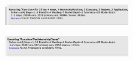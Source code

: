 \begin{figure}[h!]
    \centering\includegraphics[width=0.5\textwidth]{RASD/Images/Alloy/predclose.png}
    \label{fig:predclose}
\end{figure}
\begin{figure}[h!]
    \centering\includegraphics[width=0.5\textwidth]{RASD/Images/Alloy/predshowThatInternshipCloses.png}
    \label{fig:predshowThatInternshipCloses}
\end{figure}

